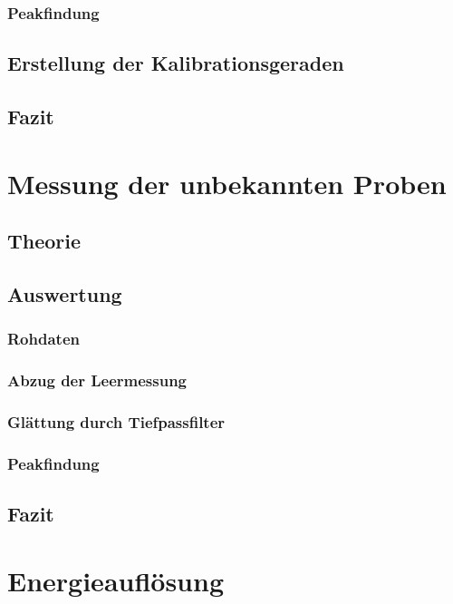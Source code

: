 \documentclass{../Misc/MontavonLaTeX/Montavon}
\begin{document}
\subsubsection{Peakfindung}


\subsection{Erstellung der Kalibrationsgeraden}

\subsection{Fazit}


\section{Messung der unbekannten Proben}
\subsection{Theorie}

\subsection{Auswertung}
\subsubsection{Rohdaten}

\subsubsection{Abzug der Leermessung}

\subsubsection{Glättung durch Tiefpassfilter}

\subsubsection{Peakfindung}

\subsection{Fazit}


\section{Energieauflösung}
\end{document}

